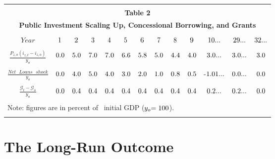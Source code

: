 \documentclass[11pt]{article}
\begin{document}
\begin{center}
\begin{tabular}{ccccccccccccc}
&  &  &  &  &  &  &  &  &  &  &  &  \\ 
\multicolumn{13}{c}{\textbf{Table 2}} \\ 
\multicolumn{13}{c}{\textbf{Public Investment Scaling Up, Concessional
Borrowing, and Grants}} \\ 
&  &  &  &  &  &  &  &  &  &  &  &  \\ \hline\hline
$Year$ & ${\small 1}$ & ${\small 2}$ & ${\small 3}$ & ${\small 4}$ & $%
{\small 5}$ & ${\small 6}$ & ${\small 7}$ & ${\small 8}$ & ${\small 9}$ & $%
{\small 10...}$ & ${\small 29...}$ & ${\small 32...}$ \\ \hline\hline
&  &  &  &  &  &  &  &  &  &  &  &  \\ 
$\frac{P_{z,o}(i_{z,t}-i_{z,o})}{y_{o}}$ & ${\small 0.0}$ & ${\small 5.0}$ & 
${\small 7.0}$ & ${\small 7.0}$ & ${\small 6.6}$ & ${\small 5.8}$ & ${\small %
5.0}$ & ${\small 4.4}$ & ${\small 4.0}$ & ${\small 3.0...}$ & ${\small 3.0...%
}$ & ${\small 3.0}$ \\ 
&  &  &  &  &  &  &  &  &  &  &  &  \\ 
$\frac{Net\text{ }Loans\text{ }shock}{y_{o}}$ & ${\small 0.0}$ & ${\small 4.0%
}$ & ${\small 5.0}$ & ${\small 4.0}$ & ${\small 3.0}$ & ${\small 2.0}$ & $%
{\small 1.0}$ & ${\small 0.8}$ & ${\small 0.5}$ & {\small -}${\small 1.01...}
$ & ${\small 0.0...}$ & ${\small 0.0}$ \\ 
&  &  &  &  &  &  &  &  &  &  &  &  \\ 
$\frac{\mathcal{G}_{t}-\mathcal{G}_{o}}{y_{o}}$ & ${\small 0.0}$ & ${\small %
0.4}$ & ${\small 0.4}$ & ${\small 0.4}$ & ${\small 0.4}$ & ${\small 0.4}$ & $%
{\small 0.4}$ & ${\small 0.4}$ & ${\small 0.4}$ & ${\small 0.2...}$ & $%
{\small 0.2...}$ & ${\small 0.0}$ \\ 
&  &  &  &  &  &  &  &  &  &  &  &  \\ \hline
\multicolumn{13}{l}{{\small Note: figures are in percent of \ initial GDP (}$%
{\small y}_{o}{\small =100}$){\small .}} \\ 
&  &  &  &  &  &  &  &  &  &  &  & 
\end{tabular}
\end{center}

\section{ The Long-Run Outcome}
\end{document}
